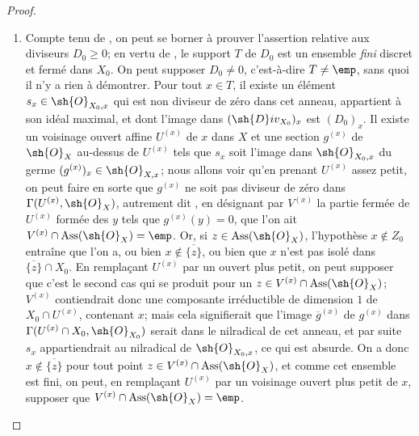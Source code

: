 \begin{proof}
\begin{enumerate}[label=(\roman*)]
  \item Compte tenu de , on peut se borner à prouver l'assertion relative aux diviseurs $D_0\geq0$;
en vertu de , le support $T$ de $D_0$ est un ensemble \emph{fini} discret et fermé dans $X_0$.
On peut supposer $D_0\neq0$, c'est-à-dire $T\neq\emp$, sans quoi il n'y a rien à démontrer.
Pour tout $x\in T$, il existe un élément $s_x\in\sh{O}_{X_0,x}$ qui est non diviseur de zéro dans cet anneau, appartient à son idéal maximal, et dont l'image dans $(\sh{D}iv_{X_0})_x$ est $(D_0)_x$.
Il existe un voisinage ouvert affine $U^{(x)}$ de $x$ dans $X$ et une section $g^{(x)}$ de $\sh{O}_X$ au-dessus de $U^{(x)}$ tels que $s_x$ soit l'image dans $\sh{O}_{X_0,x}$ du germe $(g^{(x)})_x\in\sh{O}_{X,x}$;
nous allons voir qu'en prenant $U^{(x)}$ assez petit, on peut faire en sorte que $g^{(x)}$ ne soit pas diviseur de zéro dans $\Gamma(U^{(x)},\sh{O}_X)$, autrement dit , en désignant par $V^{(x)}$ la partie fermée de $U^{(x)}$ formée des $y$ tels que $g^{(x)}(y)=0$, que l'on ait $V^{(x)}\cap\operatorname{Ass}(\sh{O}_X)=\emp$.
Or, si $z\in\operatorname{Ass}(\sh{O}_X)$, l'hypothèse $x\notin Z_0$ entraîne que l'on a, ou bien $x\notin\overline{\{z\}}$, ou bien que $x$ n'est pas isolé dans $\overline{\{z\}}\cap X_0$.
En remplaçant $U^{(x)}$ par un ouvert plus petit, on peut supposer que c'est le second cas qui se produit pour un $z\in V^{(x)}\cap\operatorname{Ass}(\sh{O}_X)$;
$V^{(x)}$ contiendrait donc une composante irréductible de dimension $1$ de $X_0\cap U^{(x)}$, contenant $x$;
mais cela signifierait que l'image $\overline{g}^{(x)}$ de $g^{(x)}$ dans $\Gamma(U^{(x)}\cap X_0,\sh{O}_{X_0})$ serait dans le nilradical de cet anneau, et par suite $s_x$ appartiendrait au nilradical de $\sh{O}_{X_0,x}$, ce qui est absurde.
On a donc $x\notin\overline{\{z\}}$ pour tout point $z\in V^{(x)}\cap\operatorname{Ass}(\sh{O}_X)$, et comme cet ensemble est fini, on peut, en remplaçant $U^{(x)}$ par un voisinage ouvert plus petit de $x$, supposer que $V^{(x)}\cap\operatorname{Ass}(\sh{O}_X)=\emp$.


\end{enumerate}
\end{proof}
